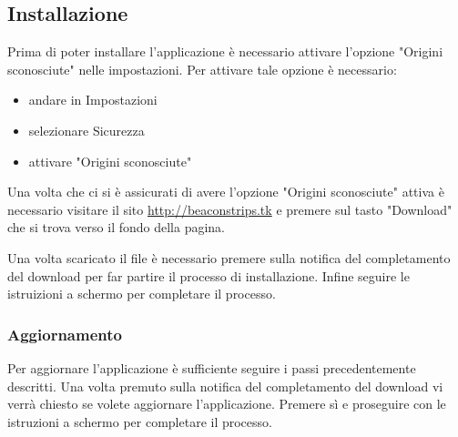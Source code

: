 \subsection{Installazione}

Prima di poter installare l'applicazione è necessario attivare l'opzione "Origini sconosciute" nelle impostazioni.
Per attivare tale opzione è necessario:
\begin{itemize}
	\item andare in Impostazioni
	\item selezionare Sicurezza
	\item attivare "Origini sconosciute"
\end{itemize}


Una volta che ci si è assicurati di avere l'opzione "Origini sconosciute" attiva è necessario visitare il sito \url{http://beaconstrips.tk} e premere sul tasto "Download" che si trova verso il fondo della pagina.


Una volta scaricato il file è necessario premere sulla notifica del completamento del download per far partire il processo di installazione. Infine seguire le istruizioni a schermo per completare il processo.

\subsubsection{Aggiornamento}

Per aggiornare l'applicazione è sufficiente seguire i passi precedentemente descritti. Una volta premuto sulla notifica del completamento del download vi verrà chiesto se volete aggiornare l'applicazione. Premere sì e proseguire con le istruzioni a schermo per completare il processo.